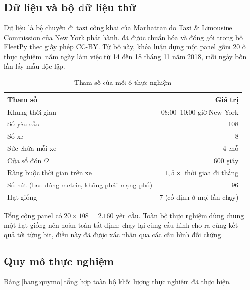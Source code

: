 \subsection{Dữ liệu và bộ dữ liệu thử}

Dữ liệu là bộ chuyến đi taxi công khai của Manhattan do Taxi \& Limousine Commission của New
York phát hành, đã được chuẩn hóa và đóng gói trong bộ FleetPy \cite{fleetpy2022} theo giấy
phép CC-BY. Từ bộ này, khóa luận dựng một panel gồm 20 ô thực nghiệm: năm ngày làm việc từ 14
đến 18 tháng 11 năm 2018, mỗi ngày bốn lần lấy mẫu độc lập.

\begin{table}[htbp]
\centering
\caption{Tham số của mỗi ô thực nghiệm}
\label{bang:thamso}
\small
\begin{tabular}{@{}lr@{}}
\toprule
\textbf{Tham số} & \textbf{Giá trị}\\
\midrule
Khung thời gian & 08:00--10:00 giờ New York\\
Số yêu cầu & 108\\
Số xe & 8\\
Sức chứa mỗi xe & 4 chỗ\\
Cửa sổ đón $\Omega$ & 600 giây\\
Ràng buộc thời gian trên xe & $1{,}5 \times$ thời gian đi thẳng\\
Số nút (bao đóng metric, không phải mạng phố) & 96\\
Hạt giống & 7 (cố định ở mọi lần chạy)\\
\bottomrule
\end{tabular}
\end{table}

Tổng cộng panel có $20 \times 108 = 2{.}160$ yêu cầu. Toàn bộ thực nghiệm dùng chung một hạt
giống nên hoàn toàn tất định: chạy lại cùng cấu hình cho ra cùng kết quả tới từng bit, điều này
đã được xác nhận qua các cấu hình đối chứng.

\subsection{Quy mô thực nghiệm}

Bảng \ref{bang:quymo} tổng hợp toàn bộ khối lượng thực nghiệm đã thực hiện.

